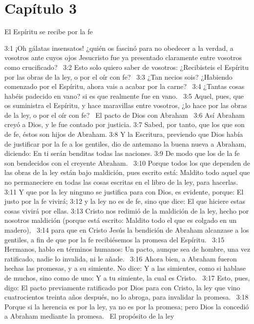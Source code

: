 \section*{Capítulo 3}
El Espíritu se recibe por la fe  

3:1 ¡Oh gálatas insensatos! ¿quién os fascinó para no obedecer a la verdad, a vosotros ante cuyos ojos Jesucristo fue ya presentado claramente entre vosotros como crucificado?  
3:2 Esto solo quiero saber de vosotros: ¿Recibisteis el Espíritu por las obras de la ley, o por el oír con fe?  
3:3 ¿Tan necios sois? ¿Habiendo comenzado por el Espíritu, ahora vais a acabar por la carne?  
3:4 ¿Tantas cosas habéis padecido en vano? si es que realmente fue en vano.  
3:5 Aquel, pues, que os suministra el Espíritu, y hace maravillas entre vosotros, ¿lo hace por las obras de la ley, o por el oír con fe?  
El pacto de Dios con Abraham  
3:6 Así Abraham creyó a Dios, y le fue contado por justicia. 
3:7 Sabed, por tanto, que los que son de fe, éstos son hijos de Abraham. 
3:8 Y la Escritura, previendo que Dios había de justificar por la fe a los gentiles, dio de antemano la buena nueva a Abraham, diciendo: En ti serán benditas todas las naciones. 
3:9 De modo que los de la fe son bendecidos con el creyente Abraham.  
3:10 Porque todos los que dependen de las obras de la ley están bajo maldición, pues escrito está: Maldito todo aquel que no permaneciere en todas las cosas escritas en el libro de la ley, para hacerlas. 
3:11 Y que por la ley ninguno se justifica para con Dios, es evidente, porque: El justo por la fe vivirá; 
3:12 y la ley no es de fe, sino que dice: El que hiciere estas cosas vivirá por ellas. 
3:13 Cristo nos redimió de la maldición de la ley, hecho por nosotros maldición (porque está escrito: Maldito todo el que es colgado en un madero),  
3:14 para que en Cristo Jesús la bendición de Abraham alcanzase a los gentiles, a fin de que por la fe recibiésemos la promesa del Espíritu.  
3:15 Hermanos, hablo en términos humanos: Un pacto, aunque sea de hombre, una vez ratificado, nadie lo invalida, ni le añade.  
3:16 Ahora bien, a Abraham fueron hechas las promesas, y a su simiente. No dice: Y a las simientes, como si hablase de muchos, sino como de uno: Y a tu simiente, la cual es Cristo.  
3:17 Esto, pues, digo: El pacto previamente ratificado por Dios para con Cristo, la ley que vino cuatrocientos treinta años después, no lo abroga, para invalidar la promesa.  
3:18 Porque si la herencia es por la ley, ya no es por la promesa; pero Dios la concedió a Abraham mediante la promesa.  
El propósito de la ley  
